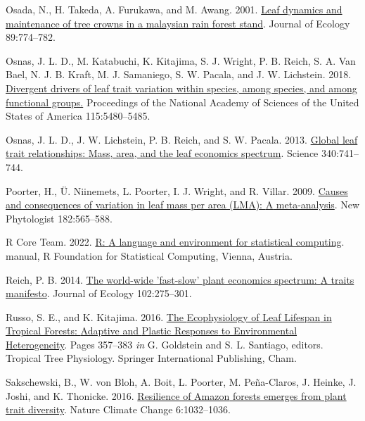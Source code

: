 \documentclass[
  12pt,
  letterpaper,
  DIV=11,
  numbers=noendperiod]{scrartcl}
\newlength{\cslhangindent}
\newlength{\cslentryspacingunit} %
\newenvironment{CSLReferences}[2] %
 {%
  \setlength{\parindent}{0pt}
  \ifodd #1
  \let\oldpar\par
  \def\par{\hangindent=\cslhangindent\oldpar}
  \fi
  \setlength{\parskip}{#2\cslentryspacingunit}
 }%
 {}
\begin{document}
\begin{CSLReferences}{1}{0}
\leavevmode{}%
Osada, N., H. Takeda, A. Furukawa, and M. Awang. 2001.
\href{https://doi.org/10.1046/j.0022-0477.2001.00590.x}{Leaf dynamics
and maintenance of tree crowns in a malaysian rain forest stand}.
Journal of Ecology 89:774--782.

\leavevmode{}%
Osnas, J. L. D., M. Katabuchi, K. Kitajima, S. J. Wright, P. B. Reich,
S. A. Van Bael, N. J. B. Kraft, M. J. Samaniego, S. W. Pacala, and J. W.
Lichstein. 2018.
\href{https://doi.org/10.1073/pnas.1803989115}{Divergent drivers of leaf
trait variation within species, among species, and among functional
groups.} Proceedings of the National Academy of Sciences of the United
States of America 115:5480--5485.

\leavevmode{}%
Osnas, J. L. D., J. W. Lichstein, P. B. Reich, and S. W. Pacala. 2013.
\href{https://doi.org/10.1126/science.1231574}{Global leaf trait
relationships: {Mass}, area, and the leaf economics spectrum}. Science
340:741--744.

\leavevmode{}%
Poorter, H., Ü. Niinemets, L. Poorter, I. J. Wright, and R. Villar.
2009. \href{https://doi.org/10.1111/j.1469-8137.2009.02830.x}{Causes and
consequences of variation in leaf mass per area ({LMA}): {A}
meta-analysis}. New Phytologist 182:565--588.

\leavevmode{}%
R Core Team. 2022. \href{https://www.R-project.org/}{R: {A} language and
environment for statistical computing}. manual, {R Foundation for
Statistical Computing}, {Vienna, Austria}.

\leavevmode{}%
Reich, P. B. 2014. \href{https://doi.org/10.1111/1365-2745.12211}{The
world-wide 'fast-slow' plant economics spectrum: {A} traits manifesto}.
Journal of Ecology 102:275--301.

\leavevmode{}%
Russo, S. E., and K. Kitajima. 2016.
\href{https://doi.org/10.1007/978-3-319-27422-5_17}{The {Ecophysiology}
of {Leaf Lifespan} in {Tropical Forests}: {Adaptive} and {Plastic
Responses} to {Environmental Heterogeneity}}. Pages 357--383 \emph{in}
G. Goldstein and S. L. Santiago, editors. Tropical {Tree Physiology}.
{Springer International Publishing}, {Cham}.

\leavevmode{}%
Sakschewski, B., W. von Bloh, A. Boit, L. Poorter, M. Peña-Claros, J.
Heinke, J. Joshi, and K. Thonicke. 2016.
\href{https://doi.org/10.1038/nclimate3109}{Resilience of {Amazon}
forests emerges from plant trait diversity}. Nature Climate Change
6:1032--1036.


\end{CSLReferences}
\end{document}

